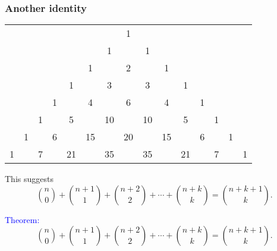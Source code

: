 \begin{frame}\frametitle{Another identity}
  \begin{tcolorbox}
    {\footnotesize
      \begin{tabular}{ccccccccccccccc}
        & & & & & & & 1 & & & & & & & \\
        & & & & & & 1 & & 1 & & & & & & \\
        & & & & & 1 & & 2 & & 1 & & & & & \\
        & & & & 1 & & 3 & & 3 & & 1 & & & & \\
        & & & 1 & & 4 & & 6 & & 4 & & 1 & & & \\
        & & 1 & & 5 & & 10 & & 10 & & 5 & & 1 & & \\
        & 1 & & 6 & & 15 & & 20 & & 15 & & 6 & & 1 & \\
        1 & & 7 & & 21 & & 35 & & 35 & & 21 & & 7 & & 1 \\
      \end{tabular}
    }
  \end{tcolorbox}
  \pause

  This suggests
  \[
  \binom{n}{0} + \binom{n+1}{1} + \binom{n+2}{2} + \cdots + \binom{n+k}{k} = \binom{n+k+1}{k}.
  \]
\end{frame}

\begin{frame}
  \textcolor{blue}{Theorem:}
  \[
  \binom{n}{0} + \binom{n+1}{1} + \binom{n+2}{2} + \cdots + \binom{n+k}{k} = \binom{n+k+1}{k}.
  \]
  \vspace{2.5in}
\end{frame}
